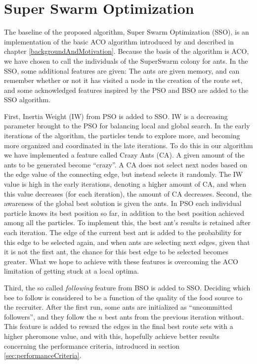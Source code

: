 \section{Super Swarm Optimization}

The baseline of the proposed algorithm, Super Swarm Optimization (SSO), is an implementation of the basic ACO algorithm introduced by \citet{nanda11} and described in chapter \vref{backgroundAndMotivation}. Because the basis of the algorithm is ACO, we have chosen to call the individuals of the SuperSwarm colony for ants. %
In the SSO, some additional features are given: The ants are given memory, and can remember whether or not it has visited a node in the creation of the route set, and some acknowledged features inspired by the PSO and BSO are added to the SSO algorithm.

First, Inertia Weight (IW) from PSO is added to SSO. IW is a decreasing parameter brought to the PSO for balancing local and global search. In the early iterations of the algorithm, the particles tends to explore more, and becoming more organized and coordinated in the late iterations.  To do this in our algorithm we have implemented a feature called Crazy Ants (CA). A given amount of the ants to be generated become ``crazy''. A CA does not select next nodes based on the edge value of the connecting edge, but instead selects it randomly. The IW value is high in the early iterations, denoting a higher amount of CA, and when this value decreases (for each iteration), the amount of CA decreases. Second, the awareness of the global best solution is given the ants. In PSO each individual particle knows its best position so far, in addition to the best position achieved among all the particles. To implement this, the best ant's results is retained after each iteration. The edge of the current best ant is added to the probability for this edge to be selected again, and when ants are selecting next edges, given that it is not the first ant, the chance for this best edge to be selected becomes greater. What we hope to achieve with these features is overcoming the ACO limitation of getting stuck at a local optima.

Third, the so called \textit{following} feature from BSO is added to SSO. Deciding which bee to follow is considered to be a function of the quality of the food source to the recruiter. After the first run, some ants are initialized as ``uncommitted followers'', and they follow the $n$ best ants from the previous iteration without. This feature is added to reward the edges in the final best route sets with a higher pheromone value, and with this, hopefully achieve better results concerning the performance criteria, introduced in section \vref{sec:performanceCriteria}.




